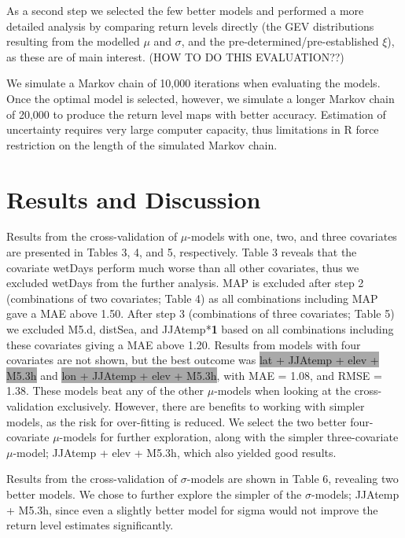\documentclass[12pt,a4paper,english]{article}
\begin{document}
As a second step we selected the few better models and performed a more detailed analysis by comparing return levels directly (the GEV distributions resulting from the modelled $\mu$ and $\sigma$, and the pre-determined/pre-established $\xi$), as these are of main interest.
(HOW TO DO THIS EVALUATION??)

We simulate a Markov chain of 10,000 iterations when evaluating the models. Once the optimal model is selected, however, we simulate a longer Markov chain of 20,000 to produce the return level maps with better accuracy. Estimation of uncertainty requires very large computer capacity, thus limitations in R force restriction on the length of the simulated Markov chain. 

\section{Results and Discussion}

Results from the cross-validation of $\mu$-models with one, two, and three covariates are presented in Tables 3, 4, and 5, respectively. Table 3 reveals that the covariate wetDays perform much worse than all other covariates, thus we excluded wetDays from the further analysis. MAP is excluded after step 2 (combinations of two covariates; Table 4) as all combinations including MAP gave a MAE above 1.50. After step 3 (combinations of three covariates; Table 5) we excluded M5.d, distSea, and JJAtemp*\textbf{1} based on all combinations including these covariates giving a MAE above 1.20. Results from models with four covariates are not shown, but the best outcome was \colorbox{DarkGray}{lat + JJAtemp + elev + M5.3h} and \colorbox{DarkGray}{lon + JJAtemp + elev + M5.3h}, with MAE = 1.08, and RMSE = 1.38. These models beat any of the other $\mu$-models when looking at the cross-validation exclusively. However, there are benefits to working with simpler models, as the risk for over-fitting is reduced. We select the two better four-covariate $\mu$-models for further exploration, along with the simpler three-covariate $\mu$-model; JJAtemp + elev + M5.3h, which also yielded good results. 

Results from the cross-validation of $\sigma$-models are shown in Table 6, revealing two better models. We chose to further explore the simpler of the $\sigma$-models; JJAtemp + M5.3h, since even a slightly better model for sigma would not improve the return level estimates significantly.
\end{document}

